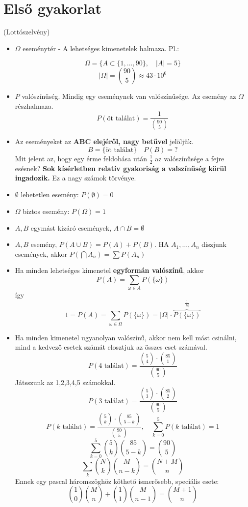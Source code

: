 \documentclass[a4paper,11.5pt]{article}
\begin{document}
	\section{Első gyakorlat}
	\begin{task}
		(Lottószelvény)
		\begin{itemize}
			\item $\varOmega$ eseménytér - A lehetséges kimenetelek halmaza. Pl.:
			
			\[ \varOmega=\big\{A\subset\{1,\ldots,90 \},\quad  |A|=5\big\} \]
			\[ |\varOmega|=\binom{90}{5}\approx43\cdot10^6 \]
			\item  $P$ valószínűség. Mindig egy eseménynek van valószínűsége. Az esemény az $\varOmega$ részhalmaza.
			\[ P(\text{öt találat})=\frac{1}{\binom{90}{5}} \]
			\item Az eseményeket az \textbf{ABC elejéről, nagy betűvel} jelöljük.
			\[ B=\{\text{öt találat} \}\quad P(B)=? \]
			Mit jelent az, hogy egy érme feldobása után $\frac{1}{2}$ az valószínűsége a fejre esésnek? \textbf{Sok kísérletben relatív gyakoriság a valszínűség körül ingadozik.} Ez a nagy számok törvénye.
			\item $\emptyset$ lehetetlen esemény: $P(\emptyset)=0$
			\item $\varOmega$ biztos esemény: $P(\varOmega)=1$
			\item $A,B$ egymást kizáró események, $A\cap B=\emptyset$
			\item $A,B$ esemény, $P(A\cup B)=P(A)+P(B)$. HA $A_1,\ldots,A_n$ diszjunk események, akkor $P(\bigcap A_n)=\sum P(A_n)$
			\item Ha minden lehetséges kimenetel \textbf{egyformán valószínű}, akkor
			\[ P(A)=\sum_{\omega\in A} P(\{\omega \}) \]
			így
			\[ 1=P(A)=\sum_{\omega\in \varOmega} P(\{\omega \})=|\varOmega|\cdot \overbrace{P(\{\omega \})}^\frac{1}{|\varOmega|} \]
			\item Ha minden kimenetel ugyanolyan valószínű, akkor nem kell mást csinálni, mind a kedvező esetek számát elosztjuk az összes eset számával. 
			\[ P(\text{4 találat})=\frac{\binom{5}{4}\cdot\binom{85}{1}}{\binom{90}{5}} \]
			Játsszunk az 1,2,3,4,5 számokkal.
			\[ P(\text{3 találat})=\frac{\binom{5}{3}\cdot\binom{85}{2}}{\binom{90}{5}} \]
			\[ P(k\text{ találat})=\frac{\binom{5}{k}\cdot\binom{85}{5-k}}{\binom{90}{5}},\quad \sum^5_{k=0}P(k\text{ találat})=1 \]
			\[ \sum^5_{k=0}\binom{5}{k}\binom{85}{5-k}=\binom{90}{5} \]
			\[ \sum_k\binom{N}{k}\binom{M}{n-k}=\binom{N+M}{n} \]
			Ennek egy pascal háromszöghöz köthető ismerősebb, speciális esete:
			\[ \binom{1}{0}\binom{M}{n}+\binom{1}{1}\binom{M}{n-1}=\binom{M+1}{n} \]
		\end{itemize}
	\end{task}
\end{document}
